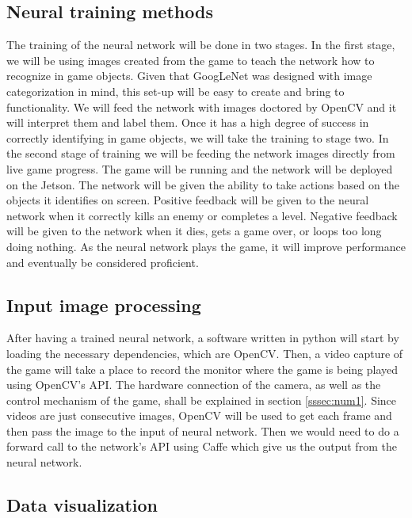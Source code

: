 \subsection{Neural training methods}%

The training of the neural network will be done in two stages.
In the first stage, we will be using images created from the game to teach the network how to recognize in game objects.
Given that GoogLeNet was designed with image categorization in mind, this set-up will be easy to create and bring to functionality.
We will feed the network with images doctored by OpenCV and it will interpret them and label them.
Once it has a high degree of success in correctly identifying in game objects, we will take the training to stage two.
\newline
\newline
In the second stage of training we will be feeding the network images directly from live game progress.
The game will be running and the network will be deployed on the Jetson.
The network will be given the ability to take actions based on the objects it identifies on screen.
Positive feedback will be given to the neural network when it correctly kills an enemy or completes a level.
Negative feedback will be given to the network when it dies, gets a game over, or loops too long doing nothing.
As the neural network plays the game, it will improve performance and eventually be considered proficient.

\subsection{Input image processing}%

After having a trained neural network, a software written in python will start by loading the necessary dependencies, which are OpenCV.
Then, a video capture of the game will take a place to record the monitor where the game is being played using OpenCV's API.
The hardware connection of the camera, as well as the control mechanism of the game, shall be explained in section \ref{sssec:num1}.
Since videos are just consecutive images, OpenCV will be used to get each frame and then pass the image to the input of neural network.
Then we would need to do a forward call to the network's API using Caffe which give us the output from the neural network.

\subsection{Data visualization}%

